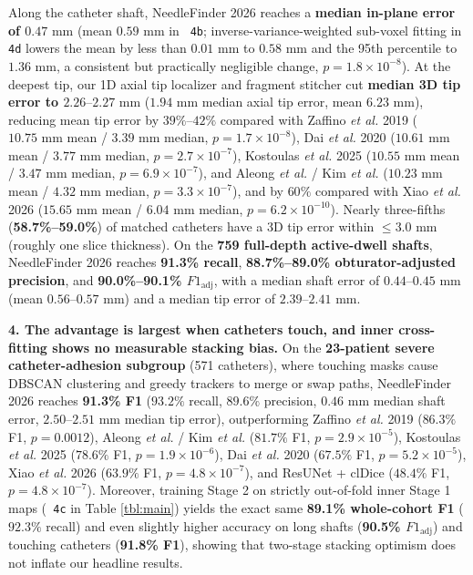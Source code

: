 \documentclass[
  11pt,
]{article}
\let\nforigtexttt\texttt
\renewcommand{\texttt}[1]{\nforigtexttt{\XeTeXinterchartokenstate=1 #1}}
\begin{document}
Along the catheter shaft, NeedleFinder 2026 reaches a \textbf{median
in-plane error of \(0.47\text{ mm}\)} (mean \(0.59\text{ mm}\) in
\texttt{4b}; inverse-variance-weighted sub-voxel fitting in \texttt{4d}
lowers the mean by less than \(0.01\text{ mm}\) to \(0.58\text{ mm}\)
and the 95th percentile to \(1.36\text{ mm}\), a consistent but
practically negligible change, \(p = 1.8 \times 10^{-8}\)). At the
deepest tip, our 1D axial tip localizer and fragment stitcher cut
\textbf{median 3D tip error to \(2.26\text{--}2.27\text{ mm}\)}
(\(1.94\text{ mm}\) median axial tip error, mean \(6.23\text{ mm}\)),
reducing mean tip error by \(39\%\text{--}42\%\) compared with Zaffino
\emph{et al.} 2019 (\(10.75\text{ mm}\) mean / \(3.39\text{ mm}\)
median, \(p = 1.7 \times 10^{-8}\)), Dai \emph{et al.} 2020
(\(10.61\text{ mm}\) mean / \(3.77\text{ mm}\) median,
\(p = 2.7 \times 10^{-7}\)), Kostoulas \emph{et al.} 2025
(\(10.55\text{ mm}\) mean / \(3.47\text{ mm}\) median,
\(p = 6.9 \times 10^{-7}\)), and Aleong \emph{et al.} / Kim \emph{et
al.} (\(10.23\text{ mm}\) mean / \(4.32\text{ mm}\) median,
\(p = 3.3 \times 10^{-7}\)), and by \(60\%\) compared with Xiao \emph{et
al.} 2026 (\(15.65\text{ mm}\) mean / \(6.04\text{ mm}\) median,
\(p = 6.2 \times 10^{-10}\)). Nearly three-fifths
(\textbf{58.7\%--59.0\%}) of matched catheters have a 3D tip error
within \(\le 3.0\text{ mm}\) (roughly one slice thickness). On the
\textbf{759 full-depth active-dwell shafts}, NeedleFinder 2026 reaches
\textbf{91.3\% recall}, \textbf{88.7\%--89.0\% obturator-adjusted
precision}, and \textbf{90.0\%--90.1\% \(F1_{\text{adj}}\)}, with a
median shaft error of \textbf{\(0.44\text{--}0.45\text{ mm}\)} (mean
\(0.56\text{--}0.57\text{ mm}\)) and a median tip error of
\textbf{\(2.39\text{--}2.41\text{ mm}\)}.

\textbf{4. The advantage is largest when catheters touch, and inner
cross-fitting shows no measurable stacking bias.} On the
\textbf{23-patient severe catheter-adhesion subgroup} (571 catheters),
where touching masks cause DBSCAN clustering and greedy trackers to
merge or swap paths, NeedleFinder 2026 reaches \textbf{91.3\% F1}
(\(93.2\%\) recall, \(89.6\%\) precision, \(0.46\text{ mm}\) median
shaft error, \(2.50\text{--}2.51\text{ mm}\) median tip error),
outperforming Zaffino \emph{et al.} 2019 (\(86.3\%\) F1,
\(p = 0.0012\)), Aleong \emph{et al.} / Kim \emph{et al.} (\(81.7\%\)
F1, \(p = 2.9 \times 10^{-5}\)), Kostoulas \emph{et al.} 2025
(\(78.6\%\) F1, \(p = 1.9 \times 10^{-6}\)), Dai \emph{et al.} 2020
(\(67.5\%\) F1, \(p = 5.2 \times 10^{-5}\)), Xiao \emph{et al.} 2026
(\(63.9\%\) F1, \(p = 4.8 \times 10^{-7}\)), and ResUNet + clDice
(\(48.4\%\) F1, \(p = 4.8 \times 10^{-7}\)). Moreover, training Stage 2
on strictly out-of-fold inner Stage 1 maps (\texttt{4c} in Table
\ref{tbl:main}) yields the exact same \textbf{89.1\% whole-cohort F1}
(\(92.3\%\) recall) and even slightly higher accuracy on long shafts
(\textbf{90.5\% \(F1_{\text{adj}}\)}) and touching catheters
(\textbf{91.8\% F1}), showing that two-stage stacking optimism does not
inflate our headline results.
\end{document}

